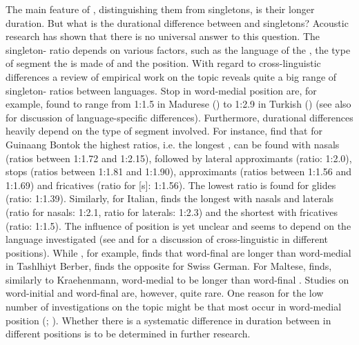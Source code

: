 The main feature of , distinguishing them from singletons, is their longer duration. But what is the durational difference between  and singletons? Acoustic research has shown that there is no universal answer to this question. The singleton- ratio depends on various factors, such as the language of the , the type of segment the  is made of and the  position. With regard to cross-linguistic differences a review of empirical work on the topic reveals quite a big range of singleton- ratios between languages.  Stop  in word-medial position are, for example, found to range from 1:1.5 in Madurese (\citealt{Cohn.1999}) to 1:2.9 in Turkish (\citealt{Lahiri.1988}) (see also \citealt[38 f.]{Dmitrieva.2017} for discussion of language-specific differences). 
Furthermore, durational differences heavily depend on the type of segment involved. For instance, \cite{Aoyama.2006} find that for Guinaang Bontok the highest ratios, i.e. the longest , can be found with nasals (ratios between 1:1.72 and 1:2.15), followed by lateral approximants (ratio: 1:2.0), stops (ratios between 1:1.81 and 1:1.90), approximants (ratios between 1:1.56 and 1:1.69) and fricatives (ratio for [s]: 1:1.56). The lowest ratio is found for glides (ratio: 1:1.39). Similarly, for Italian,  \cite{Payne.2005} finds the longest  with nasals and laterals (ratio for nasals: 1:2.1, ratio for laterals: 1:2.3) and the shortest with fricatives (ratio: 1:1.5). 
 The influence of position is yet unclear and seems to depend on the language investigated (see \citealt[chapter 3]{Galea.2016} and \citealt[36 f.]{Dmitrieva.2017} for a discussion of cross-linguistic  in different positions). While \cite{Ridouane.2010}, for example, finds that word-final  are longer than word-medial  in Tashlhiyt Berber, \cite{Kraehenmann.2001} finds the opposite for Swiss German. For Maltese, \cite{Galea.2016} finds, similarly to Kraehenmann, word-medial  to be longer than word-final . Studies on word-initial and word-final  are, however, quite rare. One reason for the low number of investigations on the topic might be that most  occur in  word-medial position (\citealt[34]{Dmitrieva.2017}; \citealt[11]{Topintzi.2017}). Whether there is a systematic difference in duration between  in different positions is to be determined in further research.
 

